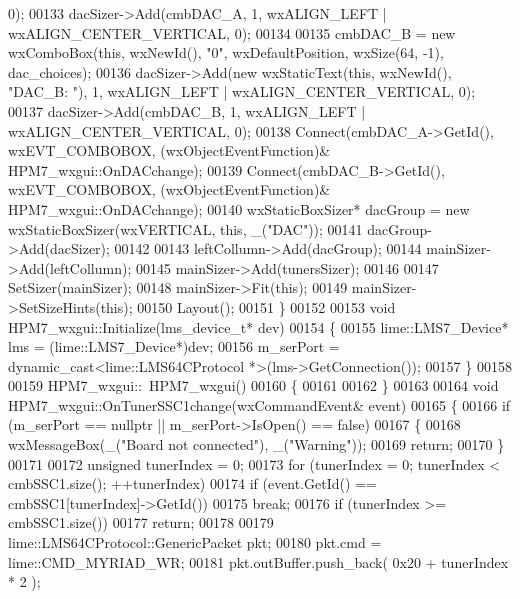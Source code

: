 \begin{DoxyCode}
{{{      0);
00133     dacSizer->Add(cmbDAC\_A, 1, wxALIGN\_LEFT | wxALIGN\_CENTER\_VERTICAL, 0);
00134 
00135     cmbDAC\_B = \textcolor{keyword}{new} wxComboBox(\textcolor{keyword}{this}, wxNewId(), \textcolor{stringliteral}{"0"}, wxDefaultPosition, wxSize(64, -1), dac\_choices);
00136     dacSizer->Add(\textcolor{keyword}{new} wxStaticText(\textcolor{keyword}{this}, wxNewId(), \textcolor{stringliteral}{"DAC\_B: "}), 1, wxALIGN\_LEFT | wxALIGN\_CENTER\_VERTICAL, 
      0);
00137     dacSizer->Add(cmbDAC\_B, 1, wxALIGN\_LEFT | wxALIGN\_CENTER\_VERTICAL, 0);
00138     Connect(cmbDAC\_A->GetId(), wxEVT\_COMBOBOX, (wxObjectEventFunction)&
      HPM7_wxgui::OnDACchange);
00139     Connect(cmbDAC\_B->GetId(), wxEVT\_COMBOBOX, (wxObjectEventFunction)&
      HPM7_wxgui::OnDACchange);
00140     wxStaticBoxSizer* dacGroup = \textcolor{keyword}{new} wxStaticBoxSizer(wxVERTICAL, \textcolor{keyword}{this}, \_(\textcolor{stringliteral}{"DAC"}));
00141     dacGroup->Add(dacSizer);
00142 
00143     leftCollumn->Add(dacGroup);
00144     mainSizer->Add(leftCollumn);
00145     mainSizer->Add(tunersSizer);
00146 
00147     SetSizer(mainSizer);
00148     mainSizer->Fit(\textcolor{keyword}{this});
00149     mainSizer->SetSizeHints(\textcolor{keyword}{this});
00150     Layout();
00151 \}
00152 
00153 \textcolor{keywordtype}{void} HPM7_wxgui::Initialize(lms_device_t* dev)
00154 \{
00155     lime::LMS7_Device* lms = (lime::LMS7_Device*)dev;
00156     m_serPort = \textcolor{keyword}{dynamic\_cast<}lime::LMS64CProtocol *\textcolor{keyword}{>}(lms->GetConnection());
00157 \}
00158 
00159 HPM7_wxgui::~HPM7_wxgui()
00160 \{
00161 
00162 \}
00163 
00164 \textcolor{keywordtype}{void} HPM7_wxgui::OnTunerSSC1change(wxCommandEvent& event)
00165 \{
00166     \textcolor{keywordflow}{if} (m_serPort == \textcolor{keyword}{nullptr} || m_serPort->IsOpen() == \textcolor{keyword}{false})
00167     \{
00168         wxMessageBox(\_(\textcolor{stringliteral}{"Board not connected"}), \_(\textcolor{stringliteral}{"Warning"}));
00169         \textcolor{keywordflow}{return};
00170     \}
00171 
00172     \textcolor{keywordtype}{unsigned} tunerIndex = 0;
00173     \textcolor{keywordflow}{for} (tunerIndex = 0; tunerIndex < cmbSSC1.size(); ++tunerIndex)
00174         \textcolor{keywordflow}{if} (event.GetId() == cmbSSC1[tunerIndex]->GetId())
00175             \textcolor{keywordflow}{break};
00176     \textcolor{keywordflow}{if} (tunerIndex >= cmbSSC1.size())
00177         \textcolor{keywordflow}{return};
00178 
00179     lime::LMS64CProtocol::GenericPacket pkt;
00180     pkt.cmd = lime::CMD_MYRIAD_WR;
00181     pkt.outBuffer.push\_back( 0x20 + tunerIndex * 2 );
}}}
\end{DoxyCode}
